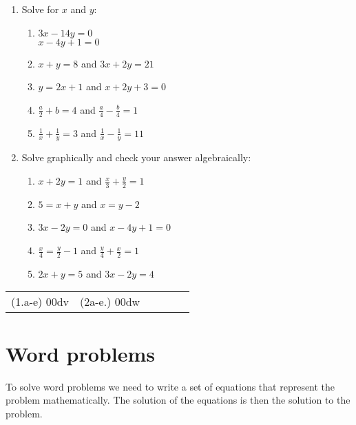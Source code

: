 \begin{exercises}{}
{
\begin{enumerate}[noitemsep, label=\textbf{\arabic*}. ] 
\item Solve for $x$ and $y$: 
\begin{enumerate}[noitemsep, label=\textbf{(\alph*)} ] 
\item $3x-14y=0$ \\ $x-4y+1=0$
\item $x+y=8$ and $3x + 2y = 21$
\item $y=2x+1$ and $x + 2y + 3 = 0$
\item $\frac{a}{2}+b=4$ and $\frac{a}{4} -\frac{b}{4}=1$
\item $\frac{1}{x}+\frac{1}{y}=3$ and $\frac{1}{x}-\frac{1}{y}=11$
\end{enumerate}

\item Solve graphically and check your answer algebraically:

\begin{enumerate}[noitemsep, label=\textbf{(\alph*)} ] 

\item  $x+2y=1$ and $\frac{x}{3} + \frac{y}{2} = 1$
\item $5= x+y$ and $x = y-2$
\item $3x - 2y = 0$ and $x - 4y + 1 = 0$
\item $\frac{x}{4}=\frac{y}{2}-1$  and $\frac{y}{4}+\frac{x}{2}=1$
\item $2x+y=5$ and $3x-2y=4$
\end{enumerate}
\end{enumerate}
\practiceinfo
\par 
\par \begin{tabular}[h]{cccccc}
(1.a-e) 00dv&  (2a-e.) 00dw & \end{tabular}
}
\end{exercises}

\section{Word problems}

To solve word problems we need to write a set of equations that represent the problem mathematically. 
The solution of the equations is then the solution to the problem.

